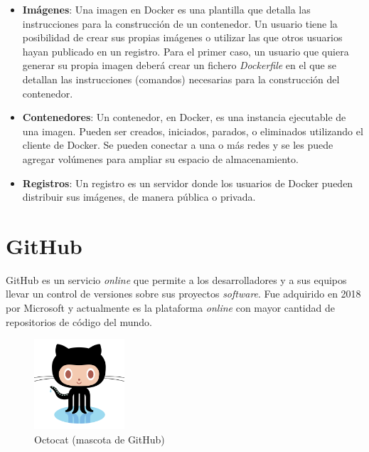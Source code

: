 \begin{itemize}
    \item \textbf{Imágenes}: Una imagen en Docker es una plantilla que detalla las instrucciones para la construcción de un contenedor. Un usuario tiene la posibilidad de crear sus propias imágenes o utilizar las que otros usuarios hayan publicado en un registro. Para el primer caso, un usuario que quiera generar su propia imagen deberá crear un fichero \emph{Dockerfile} en el que se detallan las instrucciones (comandos) necesarias para la construcción del contenedor.
    \item \textbf{Contenedores}: Un contenedor, en Docker, es una instancia ejecutable de una imagen. Pueden ser creados, iniciados, parados, o eliminados utilizando el cliente de Docker. Se pueden conectar a una o más redes y se les puede agregar volúmenes para ampliar su espacio de almacenamiento.
    \item \textbf{Registros}: Un registro es un servidor donde los usuarios de Docker pueden distribuir sus imágenes, de manera pública o privada.
\end{itemize}


\section{GitHub}

GitHub es un servicio \emph{online} que permite a los desarrolladores y a sus equipos llevar un control de versiones sobre sus proyectos \emph{software}. Fue adquirido en 2018 por Microsoft y actualmente es la plataforma \emph{online} con mayor cantidad de repositorios de código del mundo. \emph{\parencite{Reference21}}

\begin{figure}[ht]
    \centering
    \includegraphics[width=0.3\textwidth]{Figures/octocat}
    \decoRule
    \caption[Octocat]{Octocat (mascota de GitHub) \emph{\parencite{Reference23}}}
    \label{fig:octocat}
\end{figure}

